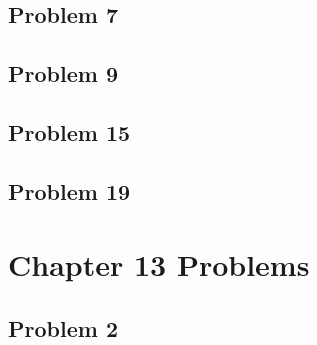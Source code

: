 \documentclass[10pt]{mypackage}
\begin{document}
\subsection{Problem 7}%
\subsection{Problem 9}%
\subsection{Problem 15}%
\subsection{Problem 19}%

\section{Chapter 13 Problems}%
\subsection{Problem 2}%
\end{document}
